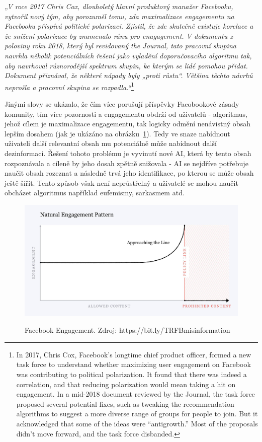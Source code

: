     \setlength\parskip{5mm}
    
    \textit{„V roce 2017 Chris Cox, dlouholetý hlavní produktový manažer Facebooku, vytvořil nový tým, aby porozuměl tomu, zda maximalizace engagementu na Facebooku přispívá politické polarizaci. Zjistil, že zde skutečně existuje korelace a že snížení polarizace by znamenalo ránu pro enagagement. V dokumentu z poloviny roku 2018, který byl revidovaný the Journal, tato pracovní skupina navrhla několik potenciálních řešení jako vyladění doporučovacího algoritmu tak, aby navrhoval různorodější spektrum skupin, ke kterým se lidé pomohou přidat. Dokument přiznával, že některé nápady byly „proti růstu“. Většina těchto návrhů neprošla a pracovní skupina se rozpadla.“}\footnote{In 2017, Chris Cox, Facebook’s longtime chief product officer, formed a new task force to understand whether maximizing user engagement on Facebook was contributing to political polarization. It found that there was indeed a correlation, and that reducing polarization would mean taking a hit on engagement. In a mid-2018 document reviewed by the Journal, the task force proposed several potential fixes, such as tweaking the recommendation algorithms to suggest a more diverse range of groups for people to join. But it acknowledged that some of the ideas were “antigrowth.” Most of the proposals didn’t move forward, and the task force disbanded.}
    
    Jinými slovy se ukázalo, že čím více porušují příspěvky Facobookové zásady komunity, tím více pozornosti a engagementu obdrží od uživatelů - algoritmus, jehož cílem je maximalizace engagementu, tak logicky odmění nenávistný obsah lepším dosahem (jak je ukázáno na obrázku~\ref{fig:fb-enagement}). Tedy ve snaze nabídnout uživateli další relevantní obsah mu potenciálně může nabídnout další dezinformaci. Řešení tohoto problému je vyvinutí nové AI, která by tento obsah rozpoznávala a cíleně by jeho dosah zpětně snižovala - AI se nejdříve potřebuje naučit obsah rozeznat a následně trvá jeho identifikace, po kterou se může obsah ještě šířit. Tento způsob však není neprůstřelný a uživatelé se mohou naučit obcházet algoritmus například eufemismy, sarkasmem atd.~\citep{hao_2021}
    \setlength\parskip{0mm}
    
    \begin{figure}[H]
        \includegraphics[width=\linewidth]{obrazky/fb_engagement.jpeg}
        \centering
        \label{fig:fb-enagement}
        \caption[Facebook Engagement]{Facebook Engagement. Zdroj: https://bit.ly/TRFBmisinformation}
    \end{figure}
    
